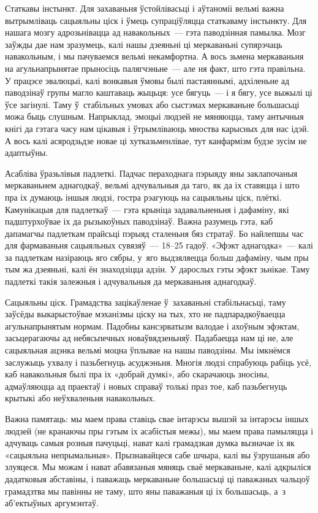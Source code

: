 Статкавы інстынкт. Для захаваньня ўстойлівасьці і аўтаноміі вельмі важна вытрымліваць сацыяльны ціск і ўмець супраціўляцца статкаваму інстынкту. Для нашага мозгу адрозьнівацца ад навакольных~--- гэта паводзінная памылка. Мозг заўжды дае нам зразумець, калі нашы дзеяньні ці меркаваньні супярэчаць навакольным, і мы пачуваемся вельмі некамфортна. А вось зьмена меркаваньня на агульнапрынятае прыносіць палягчэньне~--- але ня факт, што гэта правільна. У працэсе эвалюцыі, калі вонкавыя ўмовы былі пастаяннымі, адхіленьне ад паводзінаў групы магло каштаваць жыцьця: усе бягуць~--- і я бягу, усе выжылі ці ўсе загінулі. Таму ў~стабільных умовах або сыстэмах меркаваньне большасьці можа быць слушным. Напрыклад, эмоцыі людзей не мяняюцца, таму антычныя кнігі да гэтага часу нам цікавыя і ўтрымліваюць мноства карысных для нас ідэй. А вось калі асяродзьдзе новае ці хутказьменлівае, тут канфармізм будзе зусім не адаптыўны.

Асабліва ўразьлівыя падлеткі. Падчас пераходнага пэрыяду яны заклапочаныя меркаваньнем аднагодкаў, вельмі адчувальныя да таго, як да іх ставяцца і што пра іх думаюць іншыя людзі, гостра рэагуюць на сацыяльны ціск, плёткі. Камунікацыя для падлеткаў~--- гэта крыніца задавальненьня і дафаміну, які падштурхоўвае іх да рызыкоўных паводзінаў. Важна разумець гэта, каб дапамагчы падлеткам прайсьці пэрыяд сталеньня бяз стратаў. Бо найлепшы час для фармаваньня сацыяльных сувязяў~--- 18--25 гадоў. «Эфэкт аднагодка»~--- калі за падлеткам назіраюць яго сябры, у~яго выдзяляецца больш дафаміну, чым пры тым жа дзеяньні, калі ён знаходзіцца адзін. У дарослых гэты эфэкт зьнікае. Таму падлеткі такія залежныя і адчувальныя да меркаваньня аднагодкаў.

Сацыяльны ціск. Грамадства зацікаўленае ў~захаваньні стабільнасьці, таму заўсёды выкарыстоўвае мэханізмы ціску на тых, хто не падпарадкоўваецца агульнапрынятым нормам. Падобны кансэрватызм валодае і ахоўным эфэктам, засьцерагаючы ад небясьпечных новаўвядзеньняў. Падабаецца нам ці не, але сацыяльная ацэнка вельмі моцна ўплывае на нашы паводзіны. Мы імкнёмся заслужыць ухвалу і пазьбегнуць асуджэньня. Многія людзі спрабуюць рабіць усё, каб навакольныя былі пра іх «добрай думкі», або скарачаюць зносіны, адмаўляюцца ад праектаў і новых справаў толькі праз тое, каб пазьбегнуць крытыкі або неўхваленьня навакольных.

Важна памятаць: мы маем права ставіць свае інтарэсы вышэй за інтарэсы іншых людзей (не кранаючы пры гэтым іх асабістыя межы), мы маем права памыляцца і адчуваць самыя розныя пачуцьці, нават калі грамадзкая думка вызначае іх як «сацыяльна непрымальныя». Прызнавайцеся сабе шчыра, калі вы ўзрушаныя або злуяцеся. Мы можам і нават абавязаныя мяняць сваё меркаваньне, калі адкрыліся дадатковыя абставіны, і паважаць меркаваньне большасьці ці паважаных чальцоў грамадзтва мы павінны не таму, што яны паважаныя ці іх большасьць, а~з аб'ектыўных аргумэнтаў.

